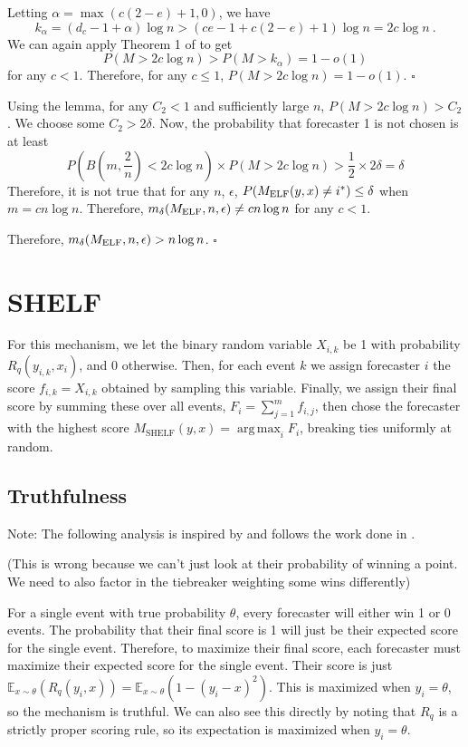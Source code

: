 \documentclass[letterpaper,12pt]{article}
\DeclareMathOperator*{\argmax}{arg\,max}
\newcommand{\E}{\mathbb{E}}
\newcommand{\1}{\mathbbm{1}}
\newcommand*{\QED}{\hfill\ensuremath{\square}}%
\begin{document}
Letting $\alpha = \max (c (2-e) + 1, 0)$, we have
\[
k_\alpha = (d_c - 1 + \alpha) \log n > (ce - 1 + c (2-e) + 1) \log n = 2c \log n \:.
\]
We can again apply Theorem 1 of \citet{raab1998balls} to get
\[
P(M > 2 c \log n) > P(M > k_\alpha) = 1 - o(1)
\]
for any $c < 1$. Therefore, for any $c \leq 1$, $P(M > 2 c \log n) = 1 - o(1)$. \hfill \QED

Using the lemma, for any $C_2 < 1$ and sufficiently large $n$, $P(M > 2 c \log n) > C_2$. We choose some $C_2 > 2\delta$. Now, the probability that forecaster 1 is not chosen is at least
\[
  P\left(B\left(m, \frac{2}{n}\right) < 2c \log n\right) \times P(M > 2 c \log n) > \frac{1}{2} \times 2\delta = \delta
\]
Therefore, it is not true that for any $n$, $\epsilon$, $P(M_{\mathrm{ELF}}(y, x) \neq i^*) \leq \delta$ when $m = c n \log n$. Therefore, $m_\delta(M_{\mathrm{ELF}}, n, \epsilon) \neq c n \log n$ for any $c < 1$. 

Therefore, $m_\delta(M_{\mathrm{ELF}}, n, \epsilon) > n \log n$. 
\hfill \QED

\section{SHELF}
\newcommand{\shelf}{M_{\mathrm{SHELF}}}

For this mechanism, we let the binary random variable $X_{i, k}$ be 1 with probability $R_q(y_{i, k}, x_i)$, and 0 otherwise. Then, for each event $k$ we assign forecaster $i$ the score $f_{i, k} = X_{i, k}$ obtained by sampling this variable. Finally, we assign their final score by summing these over all events, $F_i = \sum_{j=1}^m f_{i, j}$, then chose the forecaster with the highest score $\shelf(y, x) = \argmax_i F_i$, breaking ties uniformly at random. 

\subsection{Truthfulness}
Note: The following analysis is inspired by and follows the work done in \citet{witkowski2018incentive}.


(This is wrong because we can't just look at their probability of winning a point. We need to also factor in the tiebreaker weighting some wins differently)

For a single event with true probability $\theta$, every forecaster will either win 1 or 0 events. The probability that their final score is 1 will just be their expected score for the single event. Therefore, to maximize their final score, each forecaster must maximize their expected score for the single event. Their score is just $\E_{x \sim \theta}(R_q(y_i, x)) = \E_{x \sim \theta}(1 - (y_i - x)^2)$. This is maximized when $y_i = \theta$, so the mechanism is truthful. We can also see this directly by noting that $R_q$ is a strictly proper scoring rule, so its expectation is maximized when $y_i = \theta$. 
\end{document}
